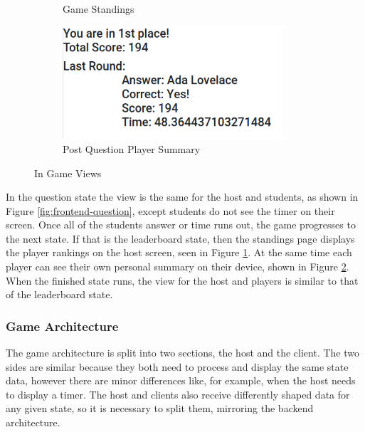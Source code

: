 \documentclass{article}
\begin{document}
\begin{figure}[H]
\begin{subfigure}[b]{0.49\textwidth}
                    \caption{Game Standings}
                    \label{fig:frontend-standings}
                \end{subfigure}
                \begin{subfigure}[b]{0.49\textwidth}
                    \centering
                    \includegraphics[width=0.9\textwidth]{images/frontend-player_summary.png}
                    \caption{Post Question Player Summary}
                    \label{fig:frontend-player_summary}
                \end{subfigure}
                \caption{In Game Views}\label{fig:frontend-user_interface}
            \end{figure}
            
            
	        In the question state the view is the same for the host and students, as shown in Figure \ref{fig:frontend-question}, except students do not see the timer on their screen. Once all of the students answer or time runs out, the game progresses to the next state. If that is the leaderboard state, then the standings page displays the player rankings on the host screen, seen in Figure \ref{fig:frontend-standings}. At the same time each player can see their own personal summary on their device, shown in Figure \ref{fig:frontend-player_summary}. When the finished state runs, the view for the host and players is similar to that of the leaderboard state.
	    
	    \subsubsection{Game Architecture}
            The game architecture is split into two sections, the host and the client. The two sides are similar because they both need to process and display the same state data, however there are minor differences like, for example, when the host needs to display a timer. The host and clients also receive differently shaped data for any given state, so it is necessary to split them, mirroring the backend architecture.
            \smallskip
            
\end{document}
